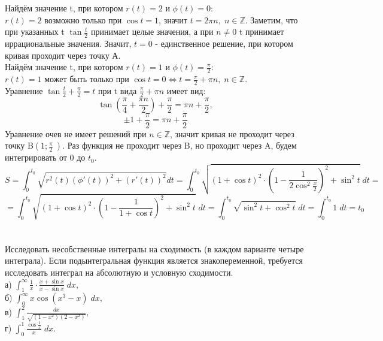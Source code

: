 \noindent Найдём значение t, при котором $r(t) = 2$ и  $\phi(t) = 0$: \\
$r(t) = 2$ возможно только при $\cos{t} = 1$, значит $t = 2\pi n, \; n \in {\displaystyle \mathbb {Z} }.$ Заметим, что при указанных t $\tan{\frac{t}{2}}$ принимает целые значения, а при $n \neq 0$ t принимает иррациональные значения. Значит, $t = 0$ - единственное решение, при котором кривая проходит через точку А. \\
Найдём значение t, при котором $r(t) = 1$ и  $\phi(t) = \frac{\pi}{2}$: \\
$r(t) = 1$ может быть только при $\cos{t} = 0 \iff t=\frac{\pi}{2} + \pi n, \; n \in {\displaystyle \mathbb {Z} }.$ \\
Уравнение $\tan{\frac{t}{2}} + \frac{\pi}{2} = t$ при t вида $\frac{\pi}{2} + \pi n$ имеет вид: \\
\[\tan(\frac{\pi}{4} + \frac{\pi n}{2} ) + \frac{\pi}{2} = \pi n + \frac{\pi}{2},\]
\[\pm1 + \frac{\pi}{2}=\pi n + \frac{\pi}{2}\] 
Уравнение очев не имеет решений при $n \in {\displaystyle \mathbb {Z} }$, значит кривая не проходит через точку B$\left(1; \frac{\pi}{2}\ \right)$. Раз функция не проходит через B, но проходит через A, будем интегрировать от 0 до $t_0$. \\
\[S = \int_{0}^{t_{0}}\sqrt{r^2(t)\left(\phi'(t)\right)^2 + \left(r'(t)\right)^2} dt = \int_{0}^{t_0}\sqrt{\left(1+\cos{t}\right)^2 \cdot \left(1 -\frac{1}{2\cos^2{\frac{x}{2}}} \right)^2 + \sin^2{t}} \; dt = \] 
\[ = \int_{0}^{t_0}\sqrt{\left(1+\cos{t}\right)^2 \cdot \left(1 -\frac{1}{1+\cos{t}} \right)^2 + \sin^2{t}} \; dt = \int_0^{t_0}\sqrt{\sin^2{t} + \cos^2{t}} \; dt = \int_0^{t_0}1 \; dt = t_{0}\]
\section{}
Исследовать несобственные интегралы на сходимость (в каждом варианте четыре интеграла).  Если  подынтегральная  функция  является  знакопеременной, требуется исследовать интеграл на абсолютную и  условную сходимости. \\
\noindent а) \(\displaystyle \int_1^{\infty}\frac{1}{x}\cdot\frac{x+\sin{x}}{x-\sin{x}} \; dx,\) \\
\noindent б) \(\displaystyle \int_0^{\infty}x\cos{\left(x^3-x\right)} \; dx,\) \\
\noindent в) \(\displaystyle \int_1^{2}\frac{dx}{\sqrt{\left(1-x^2\right)(2-x^2)}},\) \\
\noindent г) \(\displaystyle \int_0^{1}\frac{\cos{\frac{1}{x}}}{x} \; dx.\) \\

